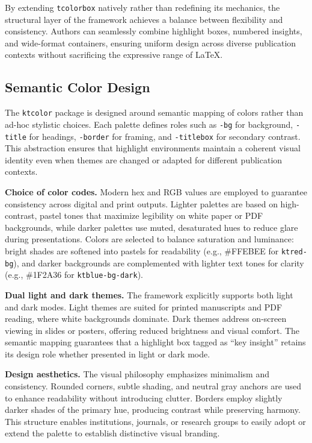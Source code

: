\documentclass[12pt,onecolumn]{article}
\begin{document}
  By extending \texttt{tcolorbox} natively rather than redefining its mechanics, the structural layer of the framework achieves a balance between flexibility and consistency. Authors can seamlessly combine highlight boxes, numbered insights, and wide-format containers, ensuring uniform design across diverse publication contexts without sacrificing the expressive range of LaTeX.

\subsection{Semantic Color Design}
\label{sec:semantic-color-design}
  The \texttt{ktcolor} package is designed around semantic mapping of colors rather than ad-hoc stylistic choices. Each palette defines roles such as \texttt{-bg} for background, \texttt{-title} for headings, \texttt{-border} for framing, and \texttt{-titlebox} for secondary contrast. This abstraction ensures that highlight environments maintain a coherent visual identity even when themes are changed or adapted for different publication contexts.

  \textbf{Choice of color codes.} Modern hex and RGB values are employed to guarantee consistency across digital and print outputs. Lighter palettes are based on high-contrast, pastel tones that maximize legibility on white paper or PDF backgrounds, while darker palettes use muted, desaturated hues to reduce glare during presentations. Colors are selected to balance saturation and luminance: bright shades are softened into pastels for readability (e.g., \#FFEBEE for \texttt{ktred-bg}), and darker backgrounds are complemented with lighter text tones for clarity (e.g., \#1F2A36 for \texttt{ktblue-bg-dark}).

  \textbf{Dual light and dark themes.} The framework explicitly supports both light and dark modes. Light themes are suited for printed manuscripts and PDF reading, where white backgrounds dominate. Dark themes address on-screen viewing in slides or posters, offering reduced brightness and visual comfort. The semantic mapping guarantees that a highlight box tagged as “key insight” retains its design role whether presented in light or dark mode.

  \textbf{Design aesthetics.} The visual philosophy emphasizes minimalism and consistency. Rounded corners, subtle shading, and neutral gray anchors are used to enhance readability without introducing clutter. Borders employ slightly darker shades of the primary hue, producing contrast while preserving harmony. This structure enables institutions, journals, or research groups to easily adopt or extend the palette to establish distinctive visual branding.
\end{document}
